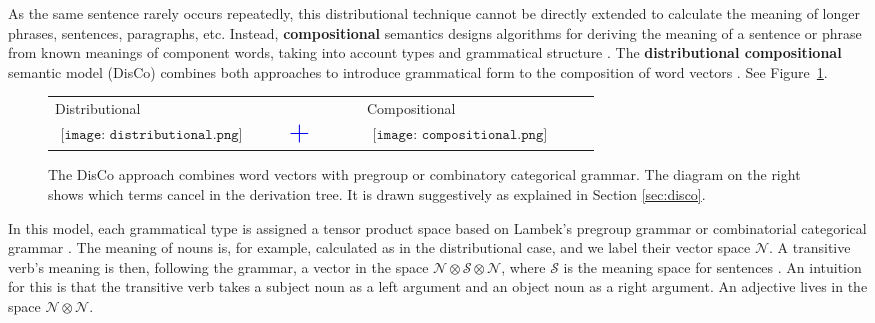 As the same sentence rarely occurs repeatedly, this distributional technique cannot be directly extended to calculate the meaning of longer phrases, sentences, paragraphs, etc. Instead, \textbf{compositional} semantics designs algorithms for deriving the meaning of a sentence or phrase from known meanings of component words,  taking into account types and grammatical structure \cite{lambek2008word}. The \textbf{distributional compositional} semantic model (DisCo) combines both approaches to introduce grammatical form to the composition of word vectors \cite{clark2008compositional}. See Figure~\ref{fig:discofig}. 

\begin{figure}[t]
\begin{center}
\begin{tabular}{m{0.3\linewidth}@{}m{0.1\linewidth}@{}m{0.3\linewidth}}
 Distributional & & Compositional \\
 $\begin{aligned}
 \texttt{[image: distributional.png]}
 \end{aligned}$
 & $\begin{aligned}\mbox{{\color{blue} \huge +}}\end{aligned}$ & 
  $\begin{aligned}
 \texttt{[image: compositional.png]}
 \end{aligned}$
\end{tabular}
\end{center}
\caption[The DisCo approach.]{The DisCo approach combines word vectors with pregroup or combinatory categorical grammar. The diagram on the right shows which terms cancel in the derivation tree.  It is drawn suggestively as explained in Section \ref{sec:disco}. }
\label{fig:discofig}
\end{figure}

In this model, each grammatical type is assigned a tensor product space based on Lambek's pregroup grammar \cite{lambek2008word} or combinatorial categorical grammar \cite{hermann2013role}. The meaning of nouns is, for example, calculated as in the distributional case, and we label their vector space $\mathcal{N}$.  A transitive verb's meaning is then, following the grammar, a vector in the space $\mathcal{N}\otimes \mathcal{S} \otimes \mathcal{N}$, where $\mathcal{S}$ is the meaning space for sentences \cite{clark2008compositional}. An intuition for this is that the transitive verb takes a subject noun as a left argument and an object noun as a right argument. An adjective lives in the space $\mathcal{N}\otimes\mathcal{N}$.

